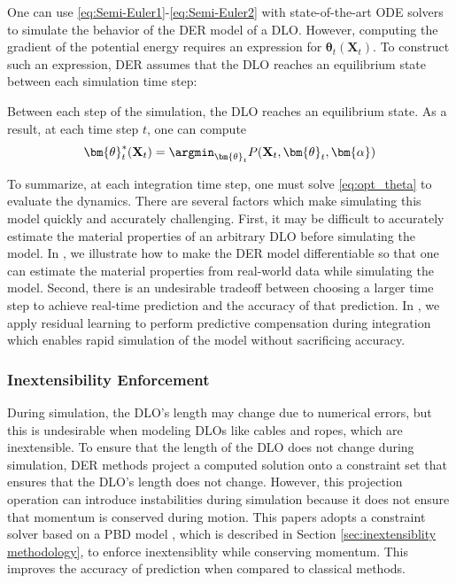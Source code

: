 One can use \eqref{eq:Semi-Euler1}-\eqref{eq:Semi-Euler2} with state-of-the-art ODE solvers to simulate the behavior of the DER model of a DLO.
However, computing the gradient of the potential energy requires an expression for $\bm{\theta}_t(\textbf{X}_t)$. 
To construct such an expression, DER assumes that the DLO reaches an equilibrium state between each simulation time step:
\begin{assum}
    Between each step of the simulation, the DLO reaches an equilibrium state. 
    As a result, at each time step $t$, one can compute
    \begin{equation}
        \bm{\theta}^*_t(\textbf{X}_t) = \argmin_{\bm{\theta}_t} P(\textbf{X}_t, \bm{\theta}_t,\bm{\alpha})
        \label{eq:opt_theta}
    \end{equation}
\end{assum}
To summarize, at each integration time step, one must solve \eqref{eq:opt_theta} to evaluate the dynamics. 
There are several factors which make simulating this model  quickly and accurately challenging.
First, it may be difficult to accurately estimate the material properties of an arbitrary DLO before simulating the model. 
In , we illustrate how to make the DER model differentiable so that one can estimate the material properties from real-world data while simulating the model.
Second, there is an undesirable tradeoff between choosing a larger time step to achieve real-time prediction and the accuracy of that prediction.
In , we apply residual learning to perform predictive compensation during integration which enables rapid simulation of the model without sacrificing accuracy.


\subsubsection{Inextensibility Enforcement}
During simulation, the DLO's length may change due to numerical errors, but this is undesirable when modeling DLOs like cables and ropes, which are inextensible.
To ensure that the length of the DLO does not change during simulation, DER methods project a computed solution onto a constraint set that ensures that the DLO's length does not change.
However, this projection operation can introduce instabilities during simulation because it does not ensure that momentum is conserved during motion.
This papers adopts a constraint solver based on a PBD model \cite{PBD}, which is described in Section \ref{sec:inextensiblity methodology}, to enforce inextensiblity while conserving momentum.
This improves the accuracy of prediction when compared to classical methods. 

